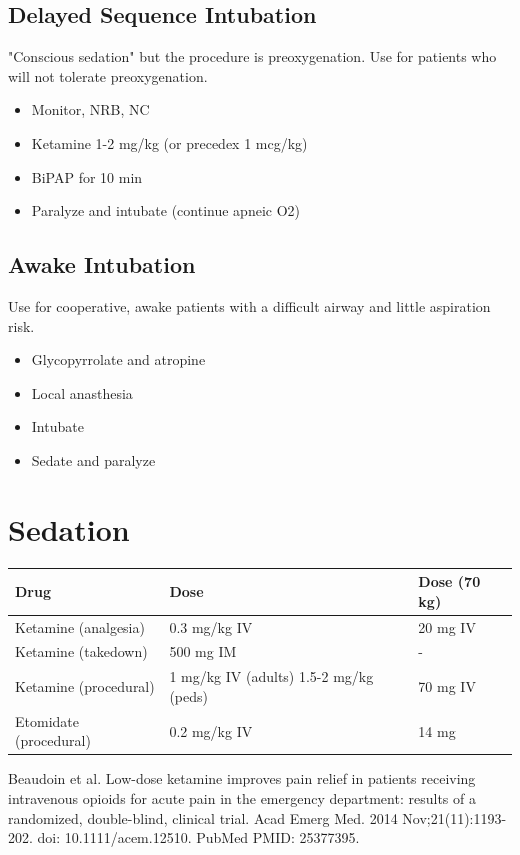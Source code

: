\documentclass[8pt]{extarticle}
\begin{document}
\subsection{Delayed Sequence Intubation}
"Conscious sedation" but the procedure is preoxygenation.
Use for patients who will not tolerate preoxygenation.
\begin{itemize}
    \item Monitor, NRB, NC
    \item Ketamine 1-2 mg/kg (or precedex 1 mcg/kg)
    \item BiPAP for 10 min
    \item Paralyze and intubate (continue apneic O2)
\end{itemize}

\subsection{Awake Intubation}
Use for cooperative, awake patients with a difficult airway and little aspiration risk.
\begin{itemize}
    \item Glycopyrrolate and atropine 
    \item Local anasthesia
    \item Intubate
    \item Sedate and paralyze
\end{itemize}

\section{Sedation}
\begin{tabularx}{\linewidth}{|X|X|X|}
\hline
Drug & Dose & Dose (70 kg) \\
\hline
Ketamine (analgesia) & 0.3 mg/kg IV & 20 mg IV \\
\hline
Ketamine (takedown) & 500 mg IM & - \\
\hline
Ketamine (procedural) & 1 mg/kg IV (adults) 1.5-2 mg/kg (peds) & 70 mg IV \\
\hline
Etomidate (procedural) & 0.2 mg/kg IV & 14 mg \\
\hline
\end{tabularx}

\tiny{Beaudoin et al. Low-dose ketamine improves pain
relief in patients receiving intravenous opioids for acute pain in the emergency department: results of a randomized, double-blind, clinical trial. Acad Emerg Med. 2014 Nov;21(11):1193-202. doi: 10.1111/acem.12510. PubMed PMID: 25377395.}
\end{document}
